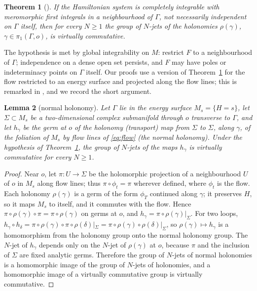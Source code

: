 \documentclass[11pt]{article}
\numberwithin{equation}{section}
\newtheorem{theorem}{Theorem}[section]
\newtheorem{lemma}[theorem]{Lemma}
\theoremstyle{definition}
\theoremstyle{remark}
\begin{document}
\begin{theorem}[{\cite[Sec.~2, Corollary~2(ii)]{MRS07}}]\label{thm:MRS}
If the Hamiltonian system is completely integrable with meromorphic first integrals in a neighbourhood of $\Gamma$,
not necessarily independent on $\Gamma$ itself, then for every $N\ge1$ the group of $N$-jets of the holonomies
$\rho(\gamma)$, $\gamma\in\pi_1(\Gamma,o)$, is virtually commutative.
\end{theorem}

The hypothesis is met by global integrability on $M$: restrict $F$ to a neighbourhood of $\Gamma$; independence on a
dense open set persists, and $F$ may have poles or indeterminacy points on $\Gamma$ itself. Our proofs use a version
of Theorem~\ref{thm:MRS} for the flow restricted to an energy surface and projected along the flow lines; this is
remarked in \cite[Sec.~2, after Corollary~2]{MRS07}, and we record the short argument.

\begin{lemma}[normal holonomy]\label{lem:normal}
Let $\Gamma$ lie in the energy surface $M_s=\{H=s\}$, let $\Sigma\subset M_s$ be a two-dimensional complex
submanifold through $o$ transverse to $\Gamma$, and let $h_\gamma$ be the germ at $o$ of the holonomy (transport) map from $\Sigma$ to $\Sigma$, along $\gamma$, of the foliation of $M_s$ by flow lines of \eqref{eq:flow} (the \emph{normal holonomy}). Under
the hypothesis of Theorem~\ref{thm:MRS}, the group of $N$-jets of the maps $h_\gamma$ is virtually commutative for
every $N\ge1$.
\end{lemma}

\begin{proof}
Near $o$, let $\pi:U\to\Sigma$ be the holomorphic projection of a neighbourhood $U$ of $o$ in $M_s$ along flow lines;
thus $\pi\circ\phi_t=\pi$ wherever defined, where $\phi_t$ is the flow. Each holonomy $\rho(\gamma)$ is a germ of the
form $\phi_{T}$ continued along $\gamma$; it preserves $H$, so it maps $M_s$ to itself, and it commutes with the flow.
Hence $\pi\circ\rho(\gamma)\circ\pi=\pi\circ\rho(\gamma)$ on germs at $o$, and $h_\gamma=\pi\circ\rho(\gamma)|_\Sigma$.
For two loops,
$h_\gamma\circ h_\delta=\pi\circ\rho(\gamma)\circ\pi\circ\rho(\delta)|_\Sigma
=\pi\circ\rho(\gamma)\circ\rho(\delta)|_\Sigma$, so $\rho(\gamma)\mapsto h_\gamma$ is a homomorphism from the
holonomy group onto the normal holonomy group. The $N$-jet of $h_\gamma$ depends only on the $N$-jet of
$\rho(\gamma)$ at $o$, because $\pi$ and the inclusion of $\Sigma$ are fixed analytic germs. Therefore the group of
$N$-jets of normal holonomies is a homomorphic image of the group of $N$-jets of holonomies, and a homomorphic image of
a virtually commutative group is virtually commutative.
\end{proof}
\end{document}
